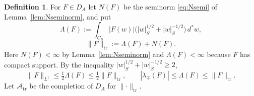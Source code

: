 \documentclass[11pt]{amsart}
\theoremstyle{definition}
\newtheorem{definition}[theorem]{Definition}
\theoremstyle{remark}
\newcommand{\dstar}{\,d^{*}}
\newcommand{\DA}{D_A}
\newcommand{\Atr}{\mathcal A_{\mathrm{tr}}}
\begin{document}
\begin{definition}\label{def:trnorm}
For $F\in\DA$ let $N(F)$ be the seminorm \eqref{eq:Nsemi} of
Lemma~\ref{lem:Nseminorm}, and put
\begin{equation}\label{eq:trnorm}
\Lambda(F):=\int_{C_S}|F(w)|\bigl(|w|_S^{1/2}+|w|_S^{-1/2}\bigr)\dstar w,
\end{equation}
\[
\lVert F\rVert_{\mathrm{tr}}:=\Lambda(F)+N(F).
\]
Here $N(F)<\infty$ by Lemma~\ref{lem:Nseminorm} and $\Lambda(F)<\infty$ because
$F$ has compact support.  By the inequality
$|w|_S^{1/2}+|w|_S^{-1/2}\ge2$,
\begin{equation}\label{eq:trnormineq}
\lVert F\rVert_{L^{1}}\le\tfrac12\Lambda(F)\le\tfrac12\lVert
F\rVert_{\mathrm{tr}},\qquad
|\lambda_{\mp}(F)|\le\Lambda(F)\le\lVert F\rVert_{\mathrm{tr}} .
\end{equation}
Let $\Atr$ be the completion of $\DA$ for $\lVert\cdot\rVert_{\mathrm{tr}}$.
\end{definition}
\end{document}
